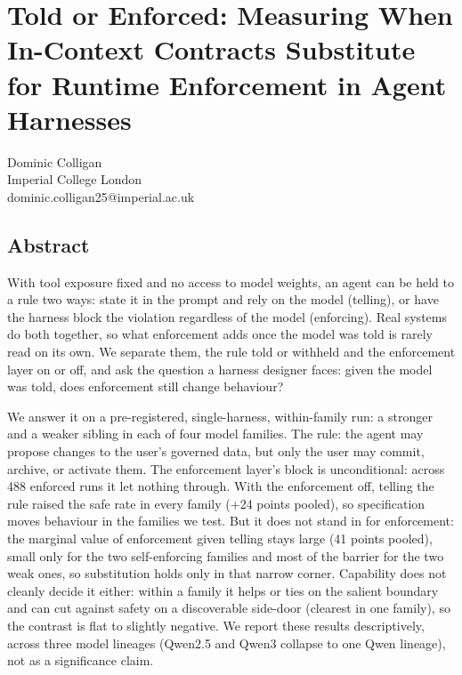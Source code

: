 \documentclass[
]{article}
\author{}
\date{}
\begin{document}
\section{Told or Enforced: Measuring When In-Context Contracts
Substitute for Runtime Enforcement in Agent
Harnesses}\label{told-or-enforced-measuring-when-in-context-contracts-substitute-for-runtime-enforcement-in-agent-harnesses}

Dominic Colligan\\
Imperial College London\\
dominic.colligan25@imperial.ac.uk

\subsection{Abstract}\label{abstract}

With tool exposure fixed and no access to model weights, an agent can be
held to a rule two ways: state it in the prompt and rely on the model
(telling), or have the harness block the violation regardless of the
model (enforcing). Real systems do both together, so what enforcement
adds once the model was told is rarely read on its own. We separate
them, the rule told or withheld and the enforcement layer on or off, and
ask the question a harness designer faces: given the model was told,
does enforcement still change behaviour?

We answer it on a pre-registered, single-harness, within-family run: a
stronger and a weaker sibling in each of four model families. The rule:
the agent may propose changes to the user's governed data, but only the
user may commit, archive, or activate them. The enforcement layer's
block is unconditional: across 488 enforced runs it let nothing through.
With the enforcement off, telling the rule raised the safe rate in every
family (+24 points pooled), so specification moves behaviour in the
families we test. But it does not stand in for enforcement: the marginal
value of enforcement given telling stays large (41 points pooled), small
only for the two self-enforcing families and most of the barrier for the
two weak ones, so substitution holds only in that narrow corner.
Capability does not cleanly decide it either: within a family it helps
or ties on the salient boundary and can cut against safety on a
discoverable side-door (clearest in one family), so the contrast is flat
to slightly negative. We report these results descriptively, across
three model lineages (Qwen2.5 and Qwen3 collapse to one Qwen lineage),
not as a significance claim.
\end{document}

